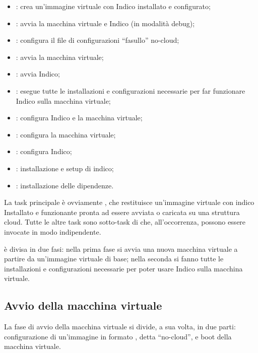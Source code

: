         \begin{itemize}
            \item {}: crea un'immagine virtuale con Indico installato e configurato;
            \item {}: avvia la macchina virtuale e Indico (in modalità debug);
            \item {}: configura il file di configurazioni ``fasullo'' no-cloud;
            \item {}: avvia la macchina virtuale;
            \item {}: avvia Indico;
            \item {}: esegue tutte le installazioni e configurazioni necessarie per far funzionare Indico sulla macchina virtuale;
            \item {}: configura Indico e la macchina virtuale;
            \item {}: configura la macchina virtuale;
            \item {}: configura Indico;
            \item {}: installazione e setup di indico;
            \item {}: installazione delle dipendenze.
        \end{itemize}
        
        La task principale è ovviamente , che restituisce un'immagine virtuale con indico Installato e funzionante pronta ad essere avviata o caricata su una struttura cloud. Tutte le altre task sono sotto-task di  che, all'occorrenza, possono essere invocate in modo indipendente.
        
         è divisa in due fasi: nella prima fase si avvia una nuova macchina virtuale a partire da un'immagine virtuale di base; nella seconda si fanno tutte le installazioni e configurazioni necessarie per poter usare Indico sulla macchina virtuale.
        
        \subsection{Avvio della macchina virtuale} \label{subsec:cd;civ;avvio_macchina_virtuale}
        
            La fase di avvio della macchina virtuale si divide, a sua volta, in due parti: configurazione di un'immagine in formato , detta ``no-cloud'', e boot della macchina virtuale.
            
